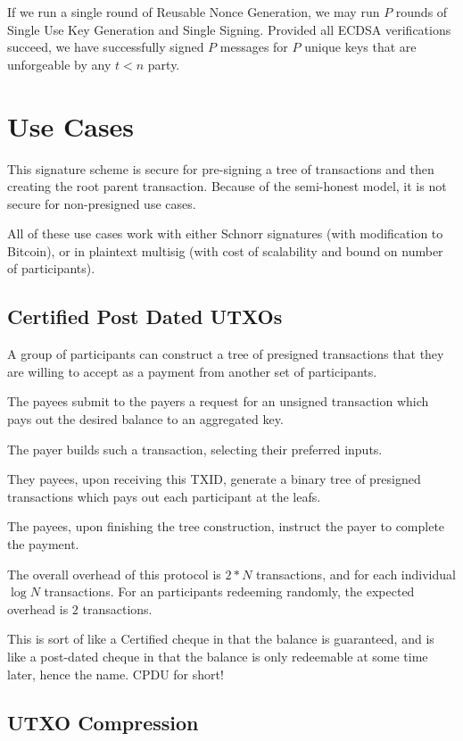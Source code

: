 \documentclass{article}
\begin{document}
If we run a single round of Reusable Nonce Generation, we may run $P$ rounds of
Single Use Key Generation and Single Signing. Provided all ECDSA verifications
succeed, we have successfully signed $P$ messages for $P$ unique keys that are
unforgeable by any $t < n$ party.

\section{Use Cases}

This signature scheme is secure for pre-signing a tree of transactions and then creating the root parent transaction. Because of the semi-honest model, it is not secure for non-presigned use cases.

All of these use cases work with either Schnorr signatures (with modification to Bitcoin), or in plaintext multisig (with cost of scalability and bound on number of participants).



\subsection{Certified Post Dated UTXOs}

A group of participants can construct a tree of presigned transactions that they are willing to accept as a payment from another set of participants.

The payees submit to the payers a request for an unsigned transaction which pays out the desired balance to an aggregated key.

The payer builds such a transaction, selecting their preferred inputs.

They payees, upon receiving this TXID, generate a binary tree of presigned transactions which pays out each participant at the leafs.

The payees, upon finishing the tree construction, instruct the payer to complete the payment.

The overall overhead of this protocol is $2*N$ transactions, and for each individual $\log N$ transactions. For an participants redeeming randomly, the expected overhead is $2$ transactions.

This is sort of like a Certified cheque in that the balance is guaranteed, and is like a post-dated cheque in that the balance is only redeemable at some time later, hence the name. CPDU for short!

\subsection{UTXO Compression}
\end{document}
